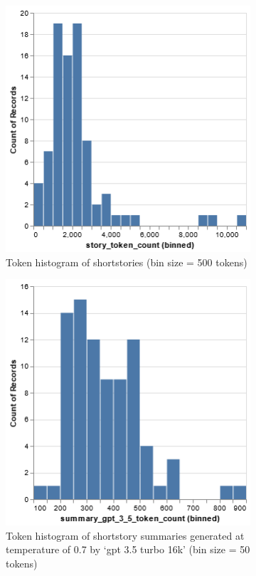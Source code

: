 \documentclass[11pt]{article}
\begin{document}
\begin{figure}[h]
\caption{Token histograms}
\label{fig:tokens}
  \begin{subfigure}[t]{.45\textwidth}
  \includegraphics[scale=0.5]{story_tokens.png}
  \caption{Token histogram of shortstories (bin size = 500 tokens)}
  \end{subfigure}%
  \hfill     
  \begin{subfigure}[t]{.45\textwidth}
  \includegraphics[scale=0.5]{summary_tokens.png}
  \caption{Token histogram of shortstory summaries generated at temperature of 0.7 by `gpt 3.5 turbo 16k' (bin size = 50 tokens)}
  \end{subfigure}
  \begin{subfigure}[t]{.95\textwidth}

\end{subfigure}
\end{figure}
\end{document}
